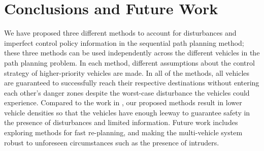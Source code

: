 \section{Conclusions and Future Work}
We have proposed three different methods to account for disturbances and imperfect control policy information in the sequential path planning method; these three methods can be used independently across the different vehicles in the path planning problem. In each method, different assumptions about the control strategy of higher-priority vehicles are made. In all of the methods, all vehicles are guaranteed to successfully reach their respective destinations without entering each other's danger zones despite the worst-case disturbance the vehicles could experience. Compared to the work in \cite{Chen15}, our proposed methods result in lower vehicle densities so that the vehicles have enough leeway to guarantee safety in the presence of disturbances and limited information. Future work includes exploring methods for fast re-planning, and making the multi-vehicle system robust to unforeseen circumstances such as the presence of intruders.